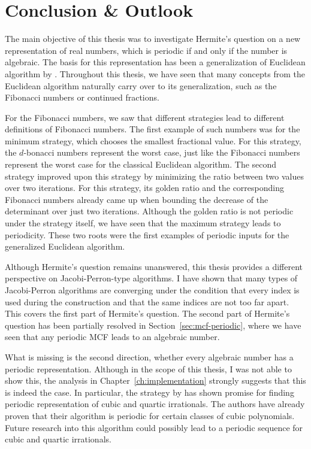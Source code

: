 \chapter{Conclusion \& Outlook}
\label{ch:conclusion}

The main objective of this thesis
was to investigate Hermite's question
on a new representation of real numbers,
which is periodic if and only if the number is algebraic.
The basis for this representation has been a generalization of Euclidean
algorithm by \citeauthor{Klein24}.
Throughout this thesis,
we have seen that many concepts from the Euclidean algorithm naturally carry
over to its generalization, such as the Fibonacci numbers or continued
fractions.

For the Fibonacci numbers,
we saw that different strategies lead to different definitions of Fibonacci numbers.
The first example of such numbers was for the minimum strategy,
which chooses the smallest fractional value.
For this strategy, the $d$-bonacci numbers represent the worst case,
just like the Fibonacci numbers represent the worst case for the classical
Euclidean algorithm.
The second strategy improved upon this strategy by minimizing the ratio between two values over two iterations.
For this strategy, its golden ratio and the corresponding Fibonacci numbers
already came up when bounding the decrease of the determinant over just two iterations.
Although the golden ratio is not periodic under the strategy itself,
we have seen that the maximum strategy leads to periodicity.
These two roots were the first examples of periodic inputs for the generalized Euclidean algorithm.

Although Hermite's question remains unanswered,
this thesis provides a different perspective on Jacobi-Perron-type algorithms.
I have shown that many types of Jacobi-Perron algorithms are converging
under the condition that every index is used during the construction and that
the same indices are not too far apart.
This covers the first part of Hermite's question.
The second part of Hermite's question has been partially resolved in Section~\ref{sec:mcf-periodic},
where we have seen that any periodic MCF leads to an algebraic number.

What is missing is the second direction,
whether every algebraic number has a periodic representation.
Although in the scope of this thesis,
I was not able to show this,
the analysis in Chapter~\ref{ch:implementation}
strongly suggests that this is indeed the case.
In particular, the strategy by \citeauthor{Tamura09} has shown promise for
finding periodic representation of cubic and quartic irrationals.
The authors have already proven that their algorithm is periodic for certain
classes of cubic polynomials.
Future research into this algorithm could possibly lead to a periodic sequence
for cubic and quartic irrationals.

